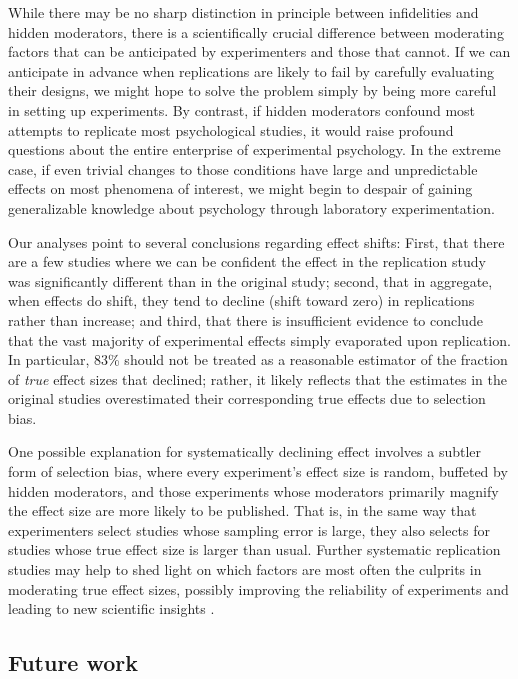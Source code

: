 \documentclass[11pt]{article}
\theoremstyle{definition}
\theoremstyle{custom}
\begin{document}
  While there may be no sharp distinction in principle between infidelities and hidden moderators, there is a scientifically crucial difference between moderating factors that can be anticipated by experimenters and those that cannot. If we can anticipate in advance when replications are likely to fail by carefully evaluating their designs, we might hope to solve the problem simply by being more careful in setting up experiments. By contrast, if hidden moderators confound most attempts to replicate most psychological studies, it would raise profound questions about the entire enterprise of experimental psychology. In the extreme case, if even trivial changes to those conditions have large and unpredictable effects on most phenomena of interest, we might begin to despair of gaining generalizable knowledge about psychology through laboratory experimentation. 

  Our analyses point to several conclusions regarding effect shifts: First, that there are a few studies where we can be confident the effect in the replication study was significantly different than in the original study; second, that in aggregate, when effects do shift, they tend to decline (shift toward zero) in replications rather than increase; and third, that there is insufficient evidence to conclude that the vast majority of experimental effects simply evaporated upon replication. In particular, 83\% should not be treated as a reasonable estimator of the fraction of {\em true} effect sizes that declined; rather, it likely reflects that the estimates in the original studies overestimated their corresponding true effects due to selection bias.

  One possible explanation for systematically declining effect involves a subtler form of selection bias, where every experiment's effect size is random, buffeted by hidden moderators, and those experiments whose moderators primarily magnify the effect size are more likely to be published. That is, in the same way that experimenters select studies whose sampling error is large, they also selects for studies whose true effect size is larger than usual. Further systematic replication studies may help to shed light on which factors are most often the culprits in moderating true effect sizes, possibly improving the reliability of experiments and leading to new scientific insights \citep{Barrett:2015vl,Klein:2018}.

\subsection{Future work}
\end{document}
